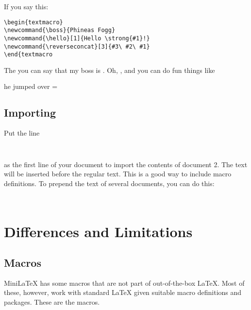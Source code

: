 \begin{textmacro}
\newcommand{\boss}{Phineas Fogg}
\newcommand{\hello}[1]{Hello \strong{#1}!}
\newcommand{\reverseconcat}[3]{#3#2#1}
\end{textmacro}


If you say this:

\begin{verbatim}
\begin{textmacro}
\newcommand{\boss}{Phineas Fogg}
\newcommand{\hello}[1]{Hello \strong{#1}!}
\newcommand{\reverseconcat}[3]{#3\ #2\ #1}
\end{textmacro
\end{verbatim}

The you can say that my boss is \boss. Oh, , and you can do fun things like

\begin{center}
he jumped over = 
\end{center}

\subsection{Importing}

Put the line 

\begin{verbatim}
  
\end{verbatim}

as the first line of your document to import the contents of document 2.  The text will be inserted before the regular text.  This is a good way to include macro definitions.  To prepend the text of several documents, you can do this:

\begin{verbatim}
  
\end{verbatim}

\section{Differences and Limitations}

\subsection{Macros}

MiniLaTeX has some macros that are not part of out-of-the-box LaTeX. Most of these, however, work with standard LaTeX given suitable macro definitions and packages. These are the  macros.

